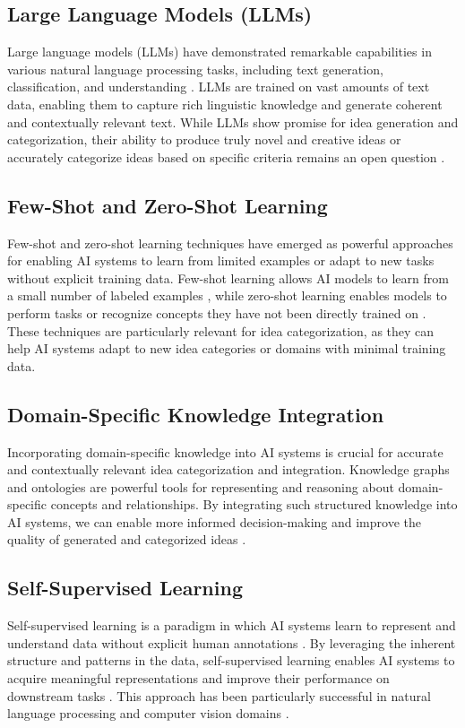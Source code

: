 \documentclass[conference]{article}
\begin{document}
	\subsection{Large Language Models (LLMs)}
	Large language models (LLMs) have demonstrated remarkable capabilities in various natural language processing tasks, including text generation, classification, and understanding \cite{brown2020language, devlin2019bert}. LLMs are trained on vast amounts of text data, enabling them to capture rich linguistic knowledge and generate coherent and contextually relevant text. While LLMs show promise for idea generation and categorization, their ability to produce truly novel and creative ideas or accurately categorize ideas based on specific criteria remains an open question \cite{bender2021dangers, marcus2020next}.
	
	\subsection{Few-Shot and Zero-Shot Learning}
	Few-shot and zero-shot learning techniques have emerged as powerful approaches for enabling AI systems to learn from limited examples or adapt to new tasks without explicit training data. Few-shot learning allows AI models to learn from a small number of labeled examples \cite{wang2020generalizing}, while zero-shot learning enables models to perform tasks or recognize concepts they have not been directly trained on \cite{xian2018zero}. These techniques are particularly relevant for idea categorization, as they can help AI systems adapt to new idea categories or domains with minimal training data.
	
	\subsection{Domain-Specific Knowledge Integration}
	Incorporating domain-specific knowledge into AI systems is crucial for accurate and contextually relevant idea categorization and integration. Knowledge graphs \cite{ji2021survey} and ontologies \cite{guarino1998formal} are powerful tools for representing and reasoning about domain-specific concepts and relationships. By integrating such structured knowledge into AI systems, we can enable more informed decision-making and improve the quality of generated and categorized ideas \cite{bosselut2019comet}.
	
	\subsection{Self-Supervised Learning}
	Self-supervised learning is a paradigm in which AI systems learn to represent and understand data without explicit human annotations \cite{jing2020self}. By leveraging the inherent structure and patterns in the data, self-supervised learning enables AI systems to acquire meaningful representations and improve their performance on downstream tasks \cite{devlin2019bert}. This approach has been particularly successful in natural language processing and computer vision domains \cite{chen2020simple}.
	
\end{document}
